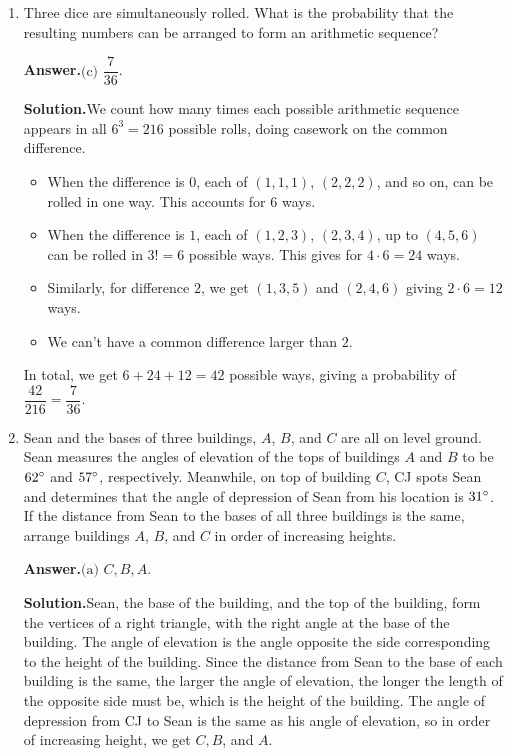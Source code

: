 \documentclass[11pt,paper=letter]{scrartcl}
\newcommand{\ans}{{\sffamily \bfseries Answer.}\;}
\newcommand{\sol}{{\sffamily \bfseries Solution.}\;}
\begin{document}
\begin{enumerate}[align=left,leftmargin=*]
\item Three dice are simultaneously rolled. What is the probability that the resulting numbers can be arranged to form an arithmetic sequence?


\ans $\boxed{\text{(c) }\dfrac{7}{36}}$.

\sol We count how many times each possible arithmetic sequence appears in all $6^3 = 216$ possible rolls, doing casework on the common difference.
\begin{itemize}[itemsep=-0.7ex]
  \item When the difference is $0$, each of $(1, 1, 1)$, $(2, 2, 2)$, and so on, can be rolled in one way. This accounts for $6$ ways.
  \item When the difference is $1$, each of $(1, 2, 3)$, $(2, 3, 4)$, up to $(4, 5, 6)$ can be rolled in $3! = 6$ possible ways. This gives for $4 \cdot 6 = 24$ ways.
  \item Similarly, for difference $2$, we get $(1, 3, 5)$ and $(2, 4, 6)$ giving $2 \cdot 6 = 12$ ways.
  \item We can't have a common difference larger than $2$.
\end{itemize}
In total, we get $6 + 24 + 12 = 42$ possible ways, giving a probability of $\dfrac{42}{216} = \dfrac{7}{36}$.

\item Sean and the bases of three buildings, $A$, $B$, and $C$ are all on level ground. Sean measures the angles of elevation of the tops of buildings $A$ and $B$ to be $62^\circ$ and $57^\circ$, respectively. Meanwhile, on top of building $C$, CJ spots Sean and determines that the angle of depression of Sean from his location is $31^\circ$. If the distance from Sean to the bases of all three buildings is the same, arrange buildings $A$, $B$, and $C$ in order of increasing heights.


\ans $\boxed{\text{(a) }C, B, A}$.

\sol Sean, the base of the building, and the top of the building, form the vertices of a right triangle, with the right angle at the base of the building. The angle of elevation is the angle opposite the side corresponding to the height of the building. Since the distance from Sean to the base of each building is the same, the larger the angle of elevation, the longer the length of the opposite side must be, which is the height of the building. The angle of depression from CJ to Sean is the same as his angle of elevation, so in order of increasing height, we get $C, B$, and $A$.


\end{enumerate}
\end{document}
